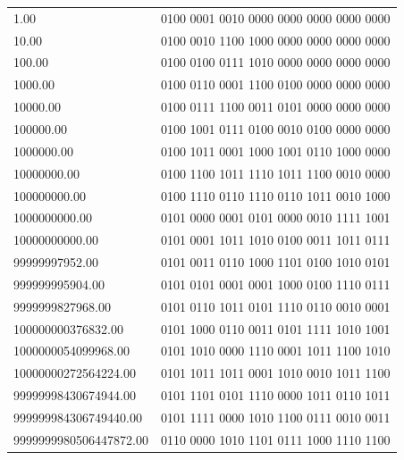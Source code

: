 \documentclass[a4paper, 12pt]{article}
\begin{document}
\begin{enumerate}
        \begin{tabular}{|l|l|}
        \hline
        1.00                          & 0100 0001 0010 0000 0000 0000 0000 0000 \\
        10.00                         & 0100 0010 1100 1000 0000 0000 0000 0000 \\
        100.00                        & 0100 0100 0111 1010 0000 0000 0000 0000 \\ \cline{1-1}
        \multicolumn{1}{|l|}{1000.00} & 0100 0110 0001 1100 0100 0000 0000 0000 \\ \cline{1-1}
        10000.00                      & 0100 0111 1100 0011 0101 0000 0000 0000 \\
        100000.00                     & 0100 1001 0111 0100 0010 0100 0000 0000 \\
        1000000.00                    & 0100 1011 0001 1000 1001 0110 1000 0000 \\
        10000000.00                   & 0100 1100 1011 1110 1011 1100 0010 0000 \\
        100000000.00                  & 0100 1110 0110 1110 0110 1011 0010 1000 \\
        1000000000.00                 & 0101 0000 0001 0101 0000 0010 1111 1001 \\
        10000000000.00                & 0101 0001 1011 1010 0100 0011 1011 0111 \\
        99999997952.00                & 0101 0011 0110 1000 1101 0100 1010 0101 \\
        999999995904.00               & 0101 0101 0001 0001 1000 0100 1110 0111 \\
        9999999827968.00              & 0101 0110 1011 0101 1110 0110 0010 0001 \\
        100000000376832.00            & 0101 1000 0110 0011 0101 1111 1010 1001 \\
        1000000054099968.00           & 0101 1010 0000 1110 0001 1011 1100 1010 \\
        10000000272564224.00          & 0101 1011 1011 0001 1010 0010 1011 1100 \\
        99999998430674944.00          & 0101 1101 0101 1110 0000 1011 0110 1011 \\
        999999984306749440.00         & 0101 1111 0000 1010 1100 0111 0010 0011 \\
        9999999980506447872.00        & 0110 0000 1010 1101 0111 1000 1110 1100 \\\hline
        \end{tabular}
        

\end{enumerate}
\end{document}
